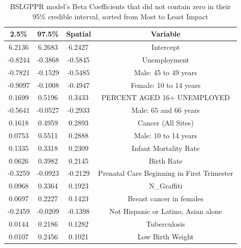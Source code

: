 \documentclass{article} %
\begin{document}
\begin{table}[h]
\centering
\begin{adjustbox}{width = 0.85\textwidth}
\begin{tabular}{cccc}
  \hline
2.5\% & 97.5\% & Spatial & Variable \\ 
  \hline
6.2136 & 6.2683 & 6.2427 & Intercept \\ 
  -0.8244 & -0.3868 & -0.5845 & Unemployment \\ 
  -0.7821 & -0.1529 & -0.5485 & Male: 45 to 49 years \\ 
  -0.9097 & -0.1008 & -0.4947 & Female: 10 to 14 years \\ 
  0.1699 & 0.5196 & 0.3433 & PERCENT AGED 16+ UNEMPLOYED \\ 
  -0.5641 & -0.0527 & -0.2933 & Male: 65 and 66 years \\ 
  0.1618 & 0.4959 & 0.2893 & Cancer (All Sites) \\ 
  0.0753 & 0.5511 & 0.2888 & Male: 10 to 14 years \\ 
  0.1335 & 0.3318 & 0.2309 & Infant Mortality Rate \\ 
  0.0626 & 0.3982 & 0.2145 & Birth Rate \\ 
  -0.3259 & -0.0923 & -0.2129 & Prenatal Care Beginning in First Trimester \\ 
  0.0968 & 0.3364 & 0.1923 & N\_Graffiti \\ 
  0.0697 & 0.2227 & 0.1423 & Breast cancer in females \\ 
  -0.2459 & -0.0209 & -0.1398 & Not Hispanic or Latino, Asian alone \\ 
  0.0144 & 0.2186 & 0.1282 & Tuberculosis \\ 
  0.0107 & 0.2456 & 0.1021 & Low Birth Weight \\ 
   \hline
\end{tabular}
\end{adjustbox}
\caption{BSLGPPR model's Beta Coefficients that did not contain zero in their 95\% credible interval, sorted from Most to Least Impact}
\label{table:spatialBetaNonZero}
\end{table}
\end{document}
